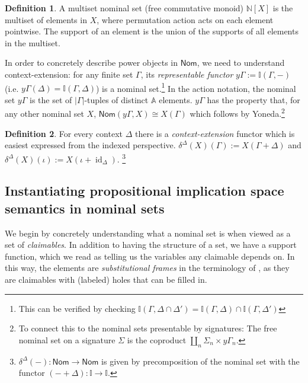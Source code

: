 \documentclass{article}
\theoremstyle{definition}
\newtheorem{definition}{Definition}[section]
\newcommand{\N}{\mathbb{N}}
\newcommand{\A}{\mathbb{A}}
\newcommand{\II}{\mathbb{I}}
\newcommand{\cat}[1]{\mathsf{#1}}
\newcommand{\id}{\operatorname{id}}
\newcommand{\Nom}{\cat{Nom}}
\begin{document}
\begin{definition}
    \label{def:nomn}
    A multiset nominal set (free commutative monoid) $\N[X]$ is the multiset of elements in $X$, where permutation action acts on each element pointwise. The support of an element is the union of the supports of all elements in the multiset.
\end{definition}

In order to concretely describe power objects in $\Nom$, we need to understand context-extension: for any finite set $\Gamma$, its {\it representable functor} $y\Gamma := \II(\Gamma,-)$ (i.e. $y\Gamma(\Delta)=\II(\Gamma,\Delta)$) is a nominal set.\footnote{This can be verified by checking $\II(\Gamma, \Delta \cap \Delta')=\II(\Gamma,\Delta)\cap\II(\Gamma,\Delta')$} In the action notation, the nominal set $y\Gamma$ is the set of $|\Gamma|$-tuples of distinct $\A$ elements.
$y\Gamma$ has the property that, for any other nominal set $X$,  $\Nom(y\Gamma, X)\cong X(\Gamma)$ which follows by Yoneda.\footnote{To connect this to the nominal sets presentable by signatures:  The free nominal set on a signature $\Sigma$ is the coproduct $\amalg_n \Sigma_n\times y\Gamma_n$.}



\begin{definition}
    \label{def:ctx}
    For every context $\Delta$ there is a {\it context-extension} functor which is easiest expressed from the indexed perspective. $\delta^{\Delta}(X)(\Gamma):=X(\Gamma+\Delta)$ and $\delta^\Delta(X)(\iota):=X(\iota+\id_\Delta)$.   
   \footnote{$\delta^{\Delta}(-)\colon \Nom\to \Nom$ is given by precomposition of the nominal set with the functor $(- + \Delta)\colon \II\to\II$.} 
\end{definition}


\subsection{Instantiating propositional implication space semantics in nominal sets}
\label{sec:instant}


We begin by concretely understanding what a nominal set is when viewed as a set of {\it claimables}. In addition to having the structure of a set, we have a support function, which we read as telling us the variables any claimable depends on. In this way, the elements are {\it substitutional frames} in the terminology of \cite[Ch 6]{brandom1994making}, as they are claimables with (labeled) holes that can be filled in. 
\end{document}
